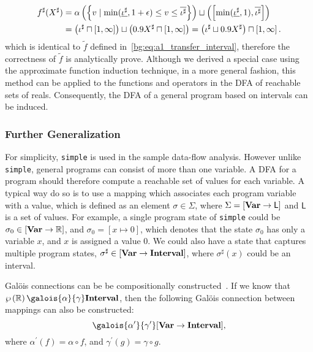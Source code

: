 \begin{equation}
    \begin{aligned}
        f^\sharp(X^\sharp)
        &= \alpha \left( \left\{
            v \mid
            \min(\underline{\iota^\sharp}, 1 + \epsilon)
                \leq v \leq \overline{\iota^\sharp}
        \right\} \right) \sqcup
        \left( \left[{
            \min(\underline{\iota^\sharp}, 1)
        }, {\overline{\iota^\sharp}}\right] \right) \\
        &= \left( \iota^\sharp \sqcap \left[{1}, {\infty}\right] \right) \sqcup
           \left( 0.9 X^\sharp \sqcap \left[{1}, {\infty}\right] \right)
         = \left( \iota^\sharp \sqcup 0.9 X^\sharp \right) \sqcap
           \left[{1}, {\infty}\right].
    \end{aligned}
\end{equation}
which is identical to $\tilde{f}$ defined
in~\eqref{bg:eq:a1_transfer_interval}, therefore the correctness of $\tilde{f}$
is analytically prove.  Although we derived a special case using the
approximate function induction technique, in a more general fashion, this
method can be applied to the functions and operators in the DFA of reachable
sets of reals.  Consequently, the DFA of a general program based on intervals
can be induced.

\subsubsection{Further Generalization}

For simplicity, \verb|simple| is used in the sample data-flow analysis.
However unlike \verb|simple|, general programs can consist of more than one
variable.  A DFA for a program should therefore compute a reachable set of
values for each variable.  A typical way do so is to use a mapping which
associates each program variable with a value, which is defined as an element
$\sigma \in \Sigma$, where $\Sigma = \left[\mathbf{Var} \to \mathsf{L}\right]$
and $\mathsf{L}$ is a set of values.  For example, a single program state of
\verb|simple| could be $\sigma_0 \in \left[\mathbf{Var} \to \mathbb{R}\right]$, and
$\sigma_0 = [x \mapsto 0]$, which denotes that the state $\sigma_0$ has only
a variable $x$, and $x$ is assigned a value $0$.  We could also have a state
that captures multiple program states, $\sigma^\sharp \in \left[\mathbf{Var} \to
\mathbf{Interval}\right]$, where $\sigma^\sharp(x)$ could be an interval.

Gal\"ois connections can be be compositionally constructed~\cite{nielson99}.
If we know that $\powersetof\realset \galois{\alpha}{\gamma} \intervalset$,
then the following Gal\"ois connection between mappings can also be
constructed:
\begin{equation}
    [\varset \to \powersetof\realset]
        \galois{\alpha^\prime}{\gamma^\prime}
    [\varset \to \intervalset],
\end{equation}
where $\alpha^\prime(f) = \alpha \circ f$, and $\gamma^\prime(g) = \gamma \circ
g$.


